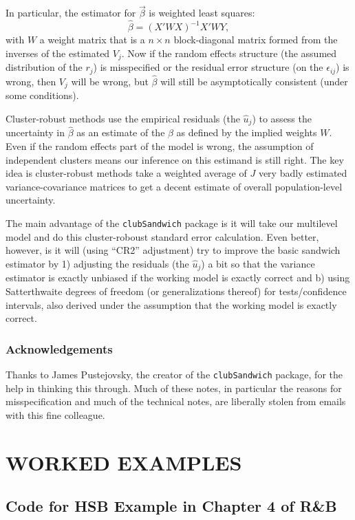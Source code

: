 \documentclass[
  letterpaper,
  DIV=11,
  numbers=noendperiod]{scrreprt}
\begin{document}
In particular, the estimator for \(\vec{\beta}\) is weighted least
squares: \[ \hat{\beta} = (X'WX)^{-1}X'W Y ,  \] with \(W\) a weight
matrix that is a \(n \times n\) block-diagonal matrix formed from the
inverses of the estimated \(V_j\). Now if the random effects structure
(the assumed distribution of the \(r_j\)) is misspecified or the
residual error structure (on the \(\epsilon_{ij}\)) is wrong, then
\(V_j\) will be wrong, but \(\hat{\beta}\) will still be asymptotically
consistent (under some conditions).

Cluster-robust methods use the empirical residuals (the \(\hat{u}_{j}\))
to assess the uncertainty in \(\hat{\beta}\) as an estimate of the
\(\beta\) as defined by the implied weights \(W\). Even if the random
effects part of the model is wrong, the assumption of independent
clusters means our inference on this estimand is still right. The key
idea is cluster-robust methods take a weighted average of \(J\) very
badly estimated variance-covariance matrices to get a decent estimate of
overall population-level uncertainty.

The main advantage of the \texttt{clubSandwich} package is it will take
our multilevel model and do this cluster-roboust standard error
calculation. Even better, however, is it will (using ``CR2'' adjustment)
try to improve the basic sandwich estimator by 1) adjusting the
residuals (the \(\hat{u}_j\)) a bit so that the variance estimator is
exactly unbiased if the working model is exactly correct and b) using
Satterthwaite degrees of freedom (or generalizations thereof) for
tests/confidence intervals, also derived under the assumption that the
working model is exactly correct.

\hypertarget{acknowledgements-1}{%
\section{Acknowledgements}\label{acknowledgements-1}}

Thanks to James Pustejovsky, the creator of the \texttt{clubSandwich}
package, for the help in thinking this through. Much of these notes, in
particular the reasons for misspecification and much of the technical
notes, are liberally stolen from emails with this fine colleague.

\part{WORKED EXAMPLES}

\hypertarget{code-for-hsb-example-in-chapter-4-of-rb}{%
\chapter{Code for HSB Example in Chapter 4 of
R\&B}\label{code-for-hsb-example-in-chapter-4-of-rb}}
\end{document}
